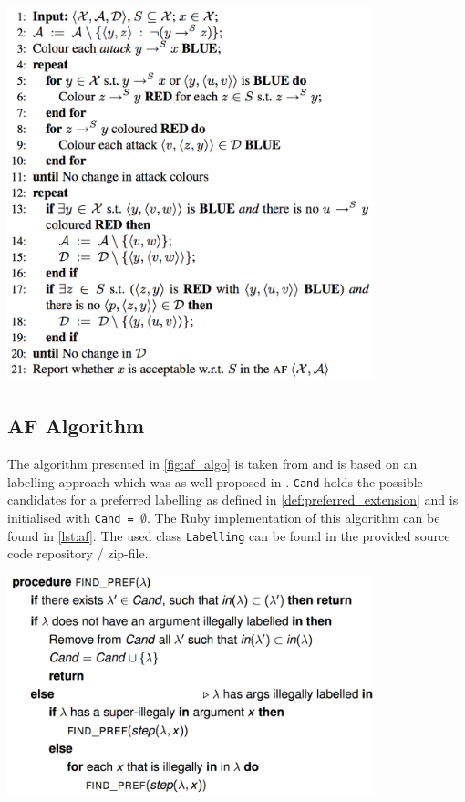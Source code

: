 \begin{algorithm}[!htp]
	\includegraphics[width=0.8\textwidth]{figures/eaf_algorithm}
	\caption{Deciding \gls{EAF} Acceptability of $x \in \X$ w.r.t. $\S \subseteq \X$ in $\langle \X, \A, \D \rangle$.}
	\label{fig:eaf_algo}
\end{algorithm}


\subsection{\Gls{AF} Algorithm}
\label{sub:af_algorithm}

The algorithm presented in \autoref{fig:af_algo} is taken from \cite{rodrigues} and is based on an labelling approach which was as well proposed in \cite{Modgil2009}. \texttt{Cand} holds the possible candidates for a preferred labelling as defined in \cref{def:preferred_extension} and is initialised with \texttt{Cand = $\emptyset$}. The Ruby implementation of this algorithm can be found in \autoref{lst:af}. The used class \texttt{Labelling} can be found in the provided source code repository / zip-file. 

\begin{algorithm}[!htp]
	\includegraphics[width=0.8\textwidth]{figures/af_labelling}
	\caption{Algorithm to compute preferred labelings $\lambda \in $ Cand for \glspl{AF} \cite{rodrigues}.}
	\label{fig:af_algo}
\end{algorithm}



